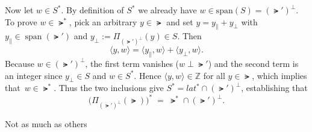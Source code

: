 \documentclass[12pt]{amsart}
\begin{document}
\begin{problem}
\begin{subproblem}
      Now let \(w\in S^{*}\). By definition of \(S^{*}\) we already have \(w\in\mathrm{span}(S)=(\lat')^\perp\).
      To prove \(w\in \lat^{*}\), pick an arbitrary \(y\in \lat\) and set 
      \(y = y_{\parallel}+y_{\perp}\) with \(y_{\parallel}\in\operatorname{span}(\lat')\) and 
      \(y_{\perp}:=\Pi_{(\lat')^\perp}(y)\in S\).  Then
      \[ \langle y,w\rangle = \langle y_{\parallel},w\rangle + \langle y_{\perp},w\rangle. \]
      Because \(w\in (\lat')^\perp\), the first term vanishes (\(w\perp \lat'\)) and the second term is an integer since
      \(y_{\perp}\in S\) and \(w\in S^{*}\).  Hence \(\langle y,w\rangle\in\mathbb Z\) for all \(y\in \lat\), which implies that\ \(w\in \lat^{*}\).
      Thus the two inclusions give \(S^{*}=lat^{*}\cap (\lat')^\perp\), establishing that
      \[ \bigl(\Pi_{(\lat')^{\perp}}\!(\lat)\bigr)^{*} \;=\; \lat^{*}\cap (\lat')^{\perp}. \]
    \end{subproblem}
  \end{problem}
  \begin{problem}
    Not as much as others
  \end{problem}
\end{document}
